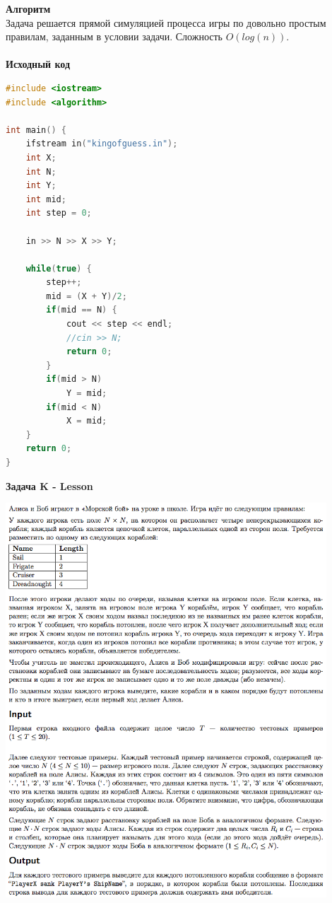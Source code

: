 \documentclass[a4paper,12pt]{article}
\begin{document}
\textbf{{\large Алгоритм}} \\
Задача решается прямой симуляцией процесса игры по довольно простым правилам, заданным в условии задачи. Сложность $O(log(n))$. \\ 
\\
\textbf{{\large Исходный код}}
\begin{lstlisting}[language=C++]
#include <iostream>
#include <algorithm>

int main() {
    ifstream in("kingofguess.in");
	int X;
	int N;
	int Y;
	int mid;
	int step = 0;

	in >> N >> X >> Y;

	while(true) {
		step++;
		mid = (X + Y)/2;
		if(mid == N) {
			cout << step << endl;
			//cin >> N;
			return 0;
		}
		if(mid > N)
			Y = mid;
		if(mid < N)
			X = mid;
	}
    return 0;
}
\end{lstlisting}
\newpage
\textbf{{\large Задача K - Lesson}} \\
\begin{center}
\includegraphics[width=0.9\textwidth]{OC_Karelia/OC_Karelia_K.png}\\ [1cm]
\end{center}
\newpage
\end{document}
